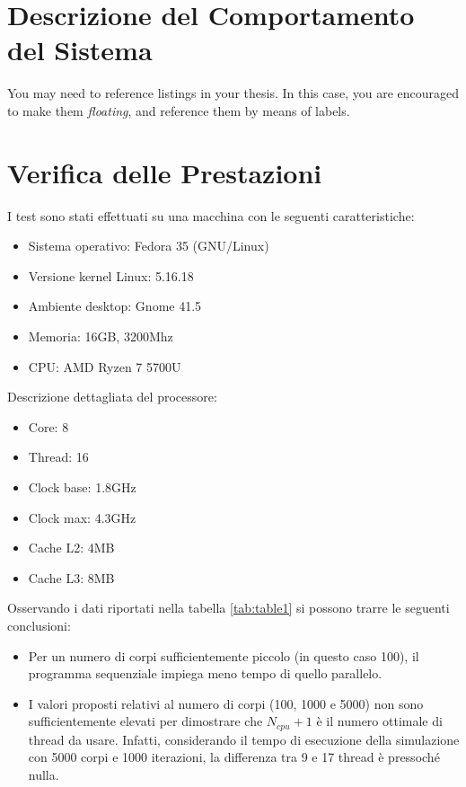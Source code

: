 \documentclass[12pt,a4paper,openright,twoside]{book}
\begin{document}
\chapter{Descrizione del Comportamento del Sistema} %
\label{chap:Descrizione del Comportamento del Sistema}

You may need to reference listings in your thesis.
%
In this case, you are encouraged to make them \emph{floating}, and reference them by means of labels.

\chapter{Verifica delle Prestazioni} %
\label{chap:Verifica delle Prestazioni}

I test sono stati effettuati su una macchina con le seguenti caratteristiche:
\begin{itemize}
	\item Sistema operativo: Fedora 35 (GNU/Linux)
	\item Versione kernel Linux: 5.16.18
	\item Ambiente desktop: Gnome 41.5
	\item Memoria: 16GB, 3200Mhz
	\item CPU: AMD Ryzen 7 5700U
\end{itemize}
Descrizione dettagliata del processore:
\begin{itemize}
	\item Core: 8
	\item Thread: 16
	\item Clock base: 1.8GHz
	\item Clock max: 4.3GHz
	\item Cache L2: 4MB
	\item Cache L3: 8MB
\end{itemize}

Osservando i dati riportati nella tabella \ref{tab:table1}
si possono trarre le seguenti conclusioni:
\begin{itemize}
	\item Per un numero di corpi sufficientemente piccolo (in questo caso 100),
	il programma sequenziale impiega meno tempo di quello parallelo.
	\item I valori proposti relativi al numero di corpi (100, 1000 e 5000) non sono sufficientemente elevati per dimostrare che $N_{cpu}+1$
	è il numero ottimale di thread da usare. Infatti, considerando il tempo di esecuzione della simulazione con 5000 corpi e 1000 iterazioni,
	la differenza tra 9 e 17 thread è pressoché nulla.
\end{itemize}
\end{document}
